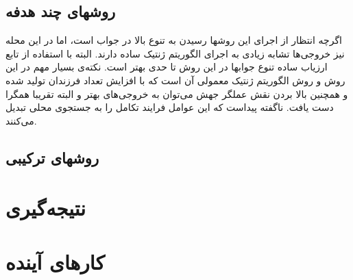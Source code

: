 \documentclass{report}
\begin{document}
\subsection{روشهای چند هدفه}
اگرچه انتظار از اجرای این روشها رسیدن به تنوع بالا در جواب است، اما در این محله نیز خروجی‌ها تشابه زیادی به اجرای الگوریتم ژنتیک ساده دارند. البته با استفاده از تابع ارزیاب ساده تنوع جوابها در این روش تا حدی بهتر است.
نکته‌ی بسیار مهم در این روش و روش الگوریتم ژنتیک معمولی آن است که با افزایش تعداد فرزندان تولید شده و همچنین بالا بردن نقش عملگر جهش می‌توان به خروجی‌های بهتر و البته تقریبا همگرا دست یافت. ناگفته پیداست که این عوامل فرایند تکامل را به جستجوی محلی تبدیل می‌کنند.

\subsection{روشهای ترکیبی}


\section{نتیجه‌گیری}

\section{کارهای آینده}
\end{document}
